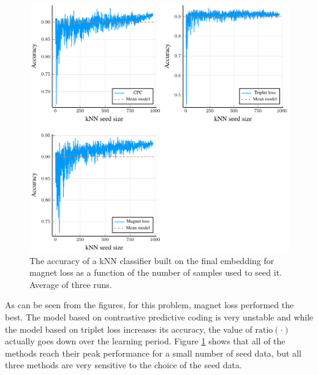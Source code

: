 \begin{figure}[h]
  \centering
  \includegraphics[width=\textwidth]{images/cisco/kNN/cisco-kNN.pdf}
  \caption{The accuracy of a kNN classifier built on the final embedding for magnet loss as a function of the number of samples used to seed it. Average of three runs.}\label{fig:cisco-kNN}
\end{figure}

As can be seen from the figures, for this problem, magnet loss performed the best. The model based on contrastive predictive coding is very unstable and while the model based on triplet loss increases its accuracy, the value of \( \mathrm{ratio} \left( \cdot \right) \) actually goes down over the learning period. Figure \ref{fig:cisco-kNN} shows that all of the methods reach their peak performance for a small number of seed data, but all three methods are very sensitive to the choice of the seed data. 
